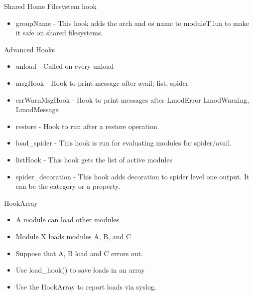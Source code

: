 \documentclass{beamer}
\begin{document}
\begin{frame}{Shared Home Filesystem hook}
  \begin{itemize}
    \item groupName - This hook adds the arch and os name to
      moduleT.lua to make it safe on shared filesystems.
  \end{itemize}
\end{frame}

\begin{frame}{Advanced Hooks}
  \begin{itemize}
    \item unload - Called on every unload
    \item msgHook - Hook to print message after avail, list, spider
    \item errWarnMsgHook - Hook to print messages after LmodError LmodWarning, LmodMessage    
    \item restore - Hook to run after a restore operation.
    \item load\_spider - This hook is run for evaluating modules for spider/avail.
    \item listHook - This hook gets the list of active modules
    \item spider\_decoration -  This hook adds decoration to spider
      level one output. It can be the category or a property.

  \end{itemize}
\end{frame}

\begin{frame}{HookArray}
  \begin{itemize}
    \item A module can load other modules
    \item Module X loads modules A, B, and C
    \item Suppose that A, B load and C errors out.
    \item Use load\_hook() to save loads in an array
    \item Use the HookArray to report loads via syslog.
  \end{itemize}
\end{frame}
\end{document}
